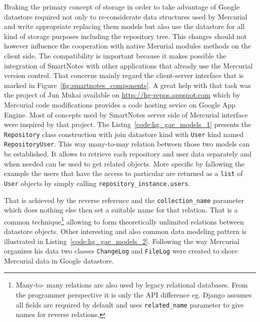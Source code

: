 Braking the primary concept of storage in order to take advantage of Google datastore required not only to re-considerate data structures used by Mercurial and write appropriate replacing them models but also use the datastore for all kind of storage purposes including the repository tree. This changes should not however influence the cooperation with native Merurial modules methods on the client side. The compatibility is important because it makes possible the integration of SmartNotes with other applications that already use the Mercurial version control. That concerns mainly regard the client-server interface that is marked in Figure~\ref{fig:smartnotes_components}. A great help with that task was the project of Jun Mukai available on \url{http://hg-repos.appspot.com} which by Mercurial code modifications provides a code hosting sevice on Google App Engine. Most of concepts used by SmartNotes server side of Mercurial interface were inspired by that project. The Listng~\ref{code:hg_gae_models_1} presents the \texttt{Repository} class construction with join datastore kind with \texttt{User} kind named \texttt{RepositoryUser}. This way many-to-may relation between those two models can be established. It allows to retrieve each repository and user data separately and when needed can be used to get related objects. More specific by fallowing the example the users that have the access to particular are returned as a \texttt{list} of \texttt{User} objects by simply calling \texttt{repository\_instance.users}.   

That is achieved by the reverse reference and the \texttt{collection\_name} parameter which does nothing else then set a suitable name for that relation. That is a common technique\footnote{Many-to- many relations are also used by legacy relational databases. From the programmer perspective it is only the API difference eg. Django assumes all fields are required by default and uses \texttt{related\_name} parameter to give names for reverse relations.} allowing to form theoretically unlimited relations between datastore objects. Other interesting and also common data modeling pattern is illustrated in Listing~\ref{code:hg_gae_models_2}. Following the way Mercurial organizes his data two classes \texttt{ChangeLog} and \texttt{FileLog} were created to shore Mercurial data in Google datastore.
